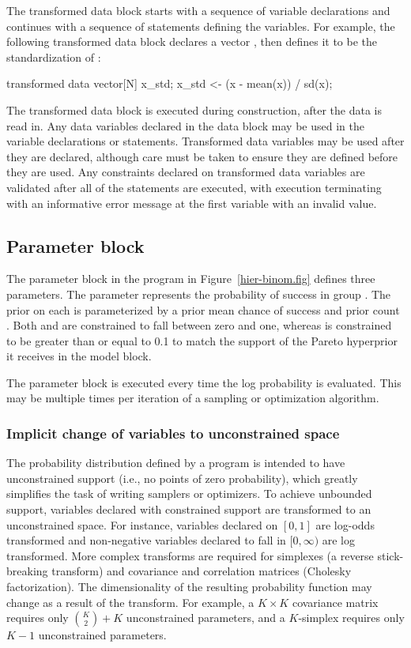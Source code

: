 \documentclass[article]{jss}
\begin{document}
The transformed data block starts with a sequence of variable
declarations and continues with a sequence of statements defining the
variables.  For example, the following transformed data block declares
a vector , then defines it to be the standardization of :
%
\begin{Code}
transformed data {
  vector[N] x_std;
  x_std <- (x - mean(x)) / sd(x);
}
\end{Code}

The transformed data block is executed during construction, after the
data is read in.  Any data variables declared in the data block may be
used in the variable declarations or statements.  Transformed data
variables may be used after they are declared, although care must be
taken to ensure they are defined before they are used.  Any
constraints declared on transformed data variables are validated after
all of the statements are executed, with execution terminating with an
informative error message at the first variable with an invalid value.

\subsection{Parameter block}

The parameter block in the program in Figure~\ref{hier-binom.fig}
defines three parameters.  The parameter  represents
the probability of success in group .  The prior on each
 is parameterized by a prior mean chance of success
 and prior count .  Both  and
 are constrained to fall between zero and one, whereas
 is constrained to be greater than or equal to 0.1 to
match the support of the Pareto hyperprior it receives in the model block.

The parameter block is executed every time the log probability is
evaluated.  This may be multiple times per iteration of a sampling or
optimization algorithm.  

\subsubsection{Implicit change of variables to unconstrained space}

The probability distribution defined by a  program is
intended to have unconstrained support (i.e., no points of zero
probability), which greatly simplifies the task of writing samplers or
optimizers.  To achieve unbounded support, variables declared with
constrained support are transformed to an unconstrained space.  For
instance, variables declared on $[0,1]$ are log-odds transformed and
non-negative variables declared to fall in $[0,\infty)$ are log
transformed.  More complex transforms are required for simplexes (a
reverse stick-breaking transform) and covariance and correlation
matrices (Cholesky factorization).  The dimensionality of the
resulting probability function may change as a result of the
transform. For example, a $K \times K$ covariance matrix requires only
${K \choose 2} + K$ unconstrained parameters, and a $K$-simplex
requires only $K-1$ unconstrained parameters.
\end{document}
